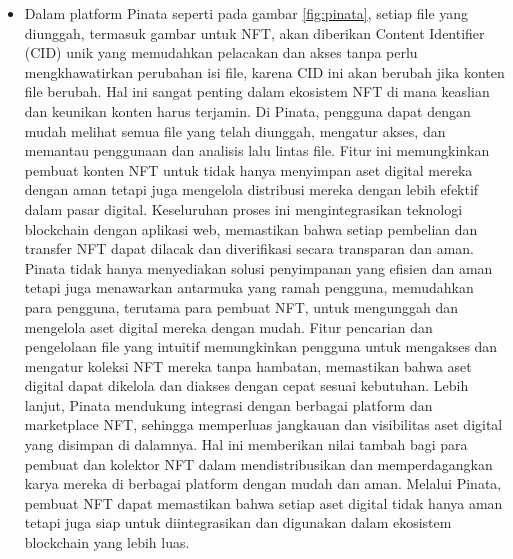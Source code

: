 \begin{itemize}
        \item Dalam platform Pinata seperti pada gambar \ref{fig:pinata}, setiap file yang diunggah, termasuk gambar untuk NFT, akan diberikan Content Identifier (CID) unik yang memudahkan pelacakan dan akses tanpa perlu mengkhawatirkan perubahan isi file, karena CID ini akan berubah jika konten file berubah. Hal ini sangat penting dalam ekosistem NFT di mana keaslian dan keunikan konten harus terjamin. Di Pinata, pengguna dapat dengan mudah melihat semua file yang telah diunggah, mengatur akses, dan memantau penggunaan dan analisis lalu lintas file. Fitur ini memungkinkan pembuat konten NFT untuk tidak hanya menyimpan aset digital mereka dengan aman tetapi juga mengelola distribusi mereka dengan lebih efektif dalam pasar digital. Keseluruhan proses ini mengintegrasikan teknologi blockchain dengan aplikasi web, memastikan bahwa setiap pembelian dan transfer NFT dapat dilacak dan diverifikasi secara transparan dan aman. Pinata tidak hanya menyediakan solusi penyimpanan yang efisien dan aman tetapi juga menawarkan antarmuka yang ramah pengguna, memudahkan para pengguna, terutama para pembuat NFT, untuk mengunggah dan mengelola aset digital mereka dengan mudah. Fitur pencarian dan pengelolaan file yang intuitif memungkinkan pengguna untuk mengakses dan mengatur koleksi NFT mereka tanpa hambatan, memastikan bahwa aset digital dapat dikelola dan diakses dengan cepat sesuai kebutuhan. Lebih lanjut, Pinata mendukung integrasi dengan berbagai platform dan marketplace NFT, sehingga memperluas jangkauan dan visibilitas aset digital yang disimpan di dalamnya. Hal ini memberikan nilai tambah bagi para pembuat dan kolektor NFT dalam mendistribusikan dan memperdagangkan karya mereka di berbagai platform dengan mudah dan aman. Melalui Pinata, pembuat NFT dapat memastikan bahwa setiap aset digital tidak hanya aman tetapi juga siap untuk diintegrasikan dan digunakan dalam ekosistem blockchain yang lebih luas.
      

\end{itemize}
